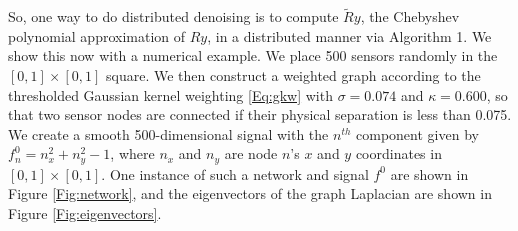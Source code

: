 \documentclass[conference]{IEEEtran}
\begin{document}
So, one way to do distributed denoising is to compute $\tilde{R}y$, the Chebyshev polynomial approximation of $Ry$, in a distributed manner via Algorithm 1. We show this now with a numerical example.
We place 500 sensors randomly in the $[0,1] \times [0,1]$ square. We then construct a weighted graph according to the thresholded Gaussian kernel weighting \eqref{Eq:gkw} with $\sigma=0.074$ and $\kappa=0.600$, so that two sensor nodes are connected if their physical separation is less than 0.075. We create a smooth 500-dimensional signal with the $n^{th}$ component given by
$f_n^0 = n_x^2+n_y^2-1$,
where $n_x$ and $n_y$ are node $n$'s $x$ and $y$ coordinates in $[0,1]\times[0,1]$. One instance of such a network and signal $f^0$ are shown in Figure \ref{Fig:network}, and the eigenvectors of the graph Laplacian are shown in Figure \ref{Fig:eigenvectors}.
\end{document}
